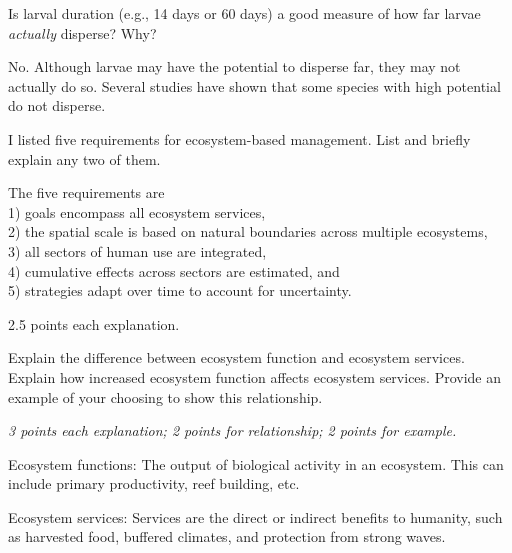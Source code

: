 \documentclass[12pt, addpoints]{exam}
\newcommand*\AnswerBox[2]{%
    \parbox[t][#1]{0.92\textwidth}{%
    \begin{solution}#2\end{solution}}
    \vspace{\stretch{1}}
}
\newenvironment{AnswerPage}[1]
    {\begin{minipage}[t][#1]{0.92\textwidth}%
    \begin{solution}}
    {\end{solution}\end{minipage}
    \vspace{\stretch{1}}}
\begin{document}
\begin{questions}

\question[5]
Is larval duration (e.g., 14 days or 60 days) a good measure of how far larvae \emph{actually} disperse? Why?

\AnswerBox{0.1\textheight}{No. Although larvae may have the potential to disperse far, they may not actually do so. Several studies have shown that some species with high potential do not disperse.}

\question[5]
I listed five requirements for ecosystem-based management. List and briefly explain any two of them.

\begin{AnswerPage}{0.25\textheight}%
	The five requirements are \\%
	1) goals encompass all ecosystem services, \\%
	2) the spatial scale is based on natural boundaries across multiple ecosystems, \\%
	3) all sectors of human use are integrated, \\%
	4) cumulative effects across sectors are estimated, and \\%
	5) strategies adapt over time to account for uncertainty.

	\medskip

	2.5 points each explanation.
\end{AnswerPage}

\question[10]
Explain the difference between ecosystem function and ecosystem services. Explain how increased ecosystem function affects ecosystem services. Provide an example of your choosing to show this relationship.

	\begin{AnswerPage}{0.4\textheight}%
	\emph{3 points each explanation; 2 points for relationship; 2 points for example.}
	
	\vspace*{\baselineskip}
	
	Ecosystem functions: The output of biological activity in an ecosystem. This can include primary productivity, reef building, etc.
	
	\vspace*{\baselineskip}
	
	Ecosystem services: Services are the direct or indirect benefits to humanity, such as harvested food, buffered climates, and protection from strong waves.
	
		\vspace*{\baselineskip}


\end{AnswerPage}
\end{questions}
\end{document}
